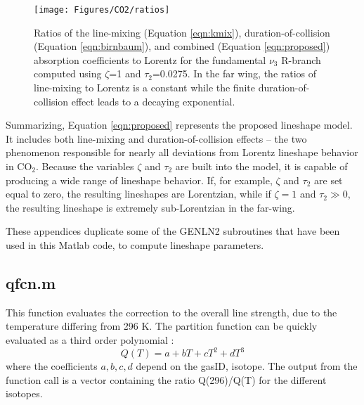 \documentclass[11pt]{article}
\begin{document}
\begin{figure}
\begin{center}\texttt{[image: Figures/CO2/ratios]}
\end{center}
  \caption[Ratios of the line-mixing, duration-of-collision, and combined
   absorption coefficients to Lorentz for the fundamental $\nu_3$ R-branch] 
    {Ratios of the line-mixing (Equation \ref{eqn:kmix}),  
    duration-of-collision (Equation \ref{eqn:birnbaum}), and combined
    (Equation \ref{eqn:proposed}) absorption coefficients to Lorentz 
    for the fundamental $\nu_3$ R-branch computed using $\zeta$=1 
    and $\tau_2$=0.0275.  In the far wing, the ratios of line-mixing to
    Lorentz is a constant while the finite duration-of-collision effect 
    leads to a decaying exponential.} 
  \label{fig:ratios}
\end{figure}

Summarizing, Equation \ref{eqn:proposed} represents the proposed lineshape
model.  It includes both line-mixing and duration-of-collision effects -- 
the
two phenomenon responsible for nearly all deviations from Lorentz lineshape
behavior in CO$_2$.  Because the variables $\zeta$ and $\tau_2$ are built
into the model, it is capable of producing a wide range of lineshape
behavior.  If, for example, $\zeta$ and
$\tau_2$ are set equal to zero, the resulting lineshapes are Lorentzian, 
while if $\zeta=1$ and $\tau_2 \gg 0$, the resulting lineshape is extremely
sub-Lorentzian in the far-wing. 

\newpage
{}
These appendices duplicate some of the GENLN2 subroutines that have 
been used in this Matlab code, to compute lineshape parameters.

\subsection{qfcn.m}
This function evaluates the correction to the overall line strength, due 
to the temperature differing from 296 K. The partition function can be 
quickly evaluated as a third order polynomial :
\begin{displaymath}
Q(T)=a + bT + cT^{2} + dT^{3}
\end{displaymath} 
where the coefficients $a,b,c,d$ depend on the gasID, isotope. The output 
from the function call is a vector containing the ratio Q(296)/Q(T) for the
different isotopes.
\end{document}
